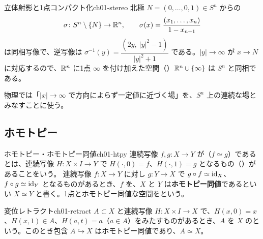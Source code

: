 \begin{myex}{立体射影と1点コンパクト化}{ch01-stereo}
北極 $N=(0,\dots,0,1)\in S^n$ からの
\[
\sigma\colon S^n\setminus\{N\}\to\mathbb{R}^n,\qquad \sigma(x)=\frac{(x_1,\dots,x_n)}{1-x_{n+1}}
\]
は同相写像で、逆写像は $\sigma^{-1}(y)=\dfrac{(2y,\ \lvert y\rvert^2-1)}{\lvert y\rvert^2+1}$ である。$\lvert y\rvert\to\infty$ が $x\to N$ に対応するので、$\mathbb{R}^n$ に1点 $\infty$ を付け加えた空間（）$\mathbb{R}^n\cup\{\infty\}$ は $S^n$ と同相である。
\begin{center}
\end{center}
物理では「$\lvert x\rvert\to\infty$ で方向によらず一定値に近づく場」を、$S^n$ 上の連続な場とみなすことに使う。
\end{myex}

\subsection{ホモトピー}

\begin{mydef}{ホモトピー・ホモトピー同値}{ch01-htpy}
連続写像 $f,g\colon X\to Y$ が（$f\simeq g$）であるとは、連続写像 $H\colon X\times I\to Y$ で $H(\cdot,0)=f$、$H(\cdot,1)=g$ となるもの（）があることをいう。
連続写像 $f\colon X\to Y$ に対し $g\colon Y\to X$ で $g\circ f\simeq\mathrm{id}_X$、$f\circ g\simeq\mathrm{id}_Y$ となるものがあるとき、$f$ を、$X$ と $Y$ は\textbf{ホモトピー同値}であるといい $X\simeq Y$ と書く。1点とホモトピー同値な空間をという。
\end{mydef}

\begin{mydef}{変位レトラクト}{ch01-retract}
$A\subset X$ と連続写像 $H\colon X\times I\to X$ で、$H(x,0)=x$、$H(x,1)\in A$、$H(a,t)=a$（$a\in A$）をみたすものがあるとき、$A$ を $X$ のという。このとき包含 $A\hookrightarrow X$ はホモトピー同値であり、$A\simeq X$。
\end{mydef}

